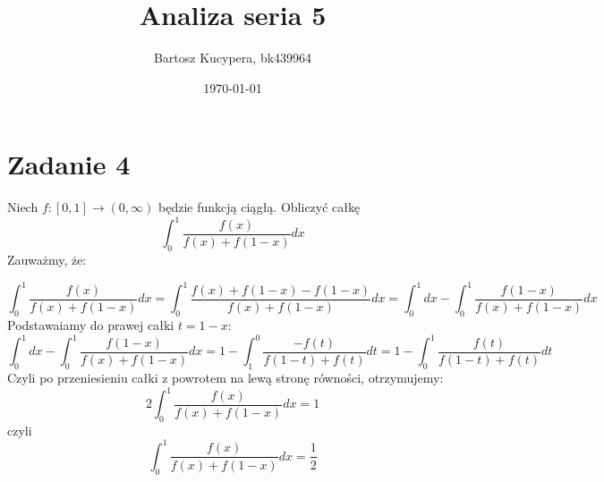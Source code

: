 \documentclass{article}
\title{Analiza seria 5}
\author{Bartosz Kucypera, bk439964}
\date{\today}
\begin{document}
\maketitle

\section*{Zadanie 4}
Niech $f : [0,1] \to (0,\infty)$ będzie funkcją ciągłą. Obliczyć całkę
$$\int_0^1\frac{f(x)}{f(x)+f(1-x)}dx$$
Zauważmy, że:

$$\int_0^1\frac{f(x)}{f(x)+f(1-x)}dx = \int_0^1\frac{f(x) + f(1-x) - f(1-x)}{f(x) + f(1-x)}dx
= \int_0^1dx - \int_0^1\frac{f(1-x)}{f(x)+f(1-x)}dx$$
Podstawaiamy do prawej całki $t=1-x$:
$$\int_0^1dx - \int_0^1\frac{f(1-x)}{f(x)+f(1-x)}dx = 1 - \int_1^0\frac{-f(t)}{f(1-t)+f(t)}dt= 1 - \int_0^1\frac{f(t)}{f(1-t)+f(t)}dt$$
Czyli po przeniesieniu całki z powrotem na lewą stronę równości, otrzymujemy:
$$2\int_0^1\frac{f(x)}{f(x)+f(1-x)}dx = 1$$
czyli
$$\int_0^1\frac{f(x)}{f(x)+f(1-x)}dx = \frac{1}{2}$$
\end{document}
